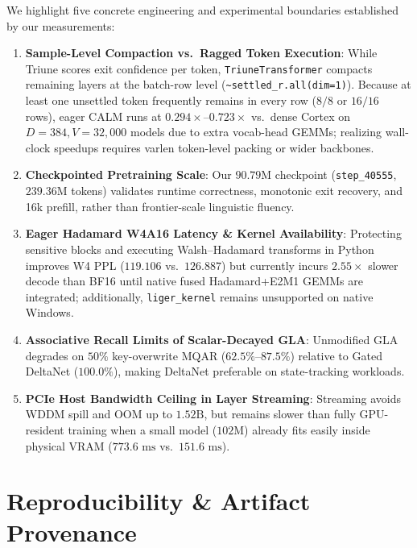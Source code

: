 \documentclass[10pt,twocolumn,letterpaper]{article}
\begin{document}
We highlight five concrete engineering and experimental boundaries established by our measurements:
\begin{enumerate}
    \item \textbf{Sample-Level Compaction vs.\ Ragged Token Execution}: While Triune scores exit confidence per token, \texttt{TriuneTransformer} compacts remaining layers at the batch-row level (\texttt{\textasciitilde settled\_r.all(dim=1)}). Because at least one unsettled token frequently remains in every row ($8/8$ or $16/16$ rows), eager CALM runs at $0.294\times\text{--}0.723\times$ vs.\ dense Cortex on $D=384, V=32,000$ models due to extra vocab-head GEMMs; realizing wall-clock speedups requires varlen token-level packing or wider backbones.
    \item \textbf{Checkpointed Pretraining Scale}: Our $90.79\text{M}$ checkpoint (\texttt{step\_40555}, $239.36\text{M}$ tokens) validates runtime correctness, monotonic exit recovery, and 16k prefill, rather than frontier-scale linguistic fluency.
    \item \textbf{Eager Hadamard W4A16 Latency \& Kernel Availability}: Protecting sensitive blocks and executing Walsh--Hadamard transforms in Python improves W4 PPL ($119.106$ vs.\ $126.887$) but currently incurs $2.55\times$ slower decode than BF16 until native fused Hadamard+E2M1 GEMMs are integrated; additionally, \texttt{liger\_kernel} remains unsupported on native Windows.
    \item \textbf{Associative Recall Limits of Scalar-Decayed GLA}: Unmodified GLA degrades on $50\%$ key-overwrite MQAR ($62.5\%\text{--}87.5\%$) relative to Gated DeltaNet ($100.0\%$), making DeltaNet preferable on state-tracking workloads.
    \item \textbf{PCIe Host Bandwidth Ceiling in Layer Streaming}: Streaming avoids WDDM spill and OOM up to $1.52\text{B}$, but remains slower than fully GPU-resident training when a small model ($102\text{M}$) already fits easily inside physical VRAM ($773.6\text{ ms}$ vs.\ $151.6\text{ ms}$).
\end{enumerate}

\section{Reproducibility \& Artifact Provenance}
\end{document}
